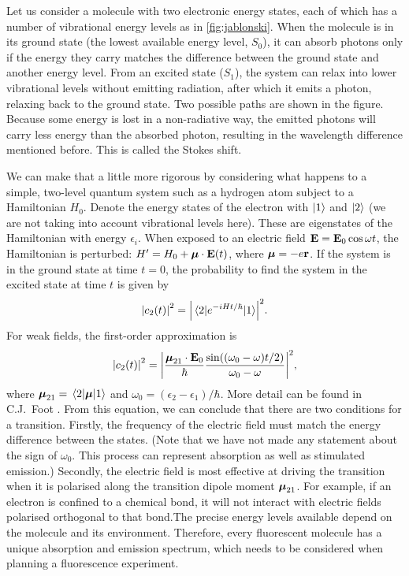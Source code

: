 Let us consider a molecule with two electronic energy states, each of which has a number of vibrational energy levels as in \autoref{fig:jablonski}. When the molecule is in its ground state (the lowest available energy level, $ S_0 $), it can absorb photons only if the energy they carry matches the difference between the ground state and another energy level. From an excited state ($ S_1 $), the system can relax into lower vibrational levels without emitting radiation, after which it emits a photon, relaxing back to the ground state. Two possible paths are shown in the figure. Because some energy is lost in a non-radiative way, the emitted photons will carry less energy than the absorbed photon, resulting in the wavelength difference mentioned before. This is called the Stokes shift. 

We can make that a little more rigorous by considering what happens to a simple, two-level quantum system such as a hydrogen atom subject to a Hamiltonian $ H_0 $. Denote the energy states of the electron with $ \ket{1} $ and $ \ket{2} $ (we are not taking into account vibrational levels here). These are eigenstates of the Hamiltonian with energy $ \epsilon_i $. When exposed to an electric field $ \vb{E} = \vb{E}_0 \cos\omega t$, the Hamiltonian is perturbed: $ H' = H_0 + \vb*{\mu} \cdot \vb{E}(t) $, where $ \vb*{\mu} = -e\vb{r}$. If the system is in the ground state at time $ t=0 $, the probability to find the system in the excited state at time $ t $ is given by
\begin{equation}
	\abs{c_2(t)}^2 = \abs{\mel{2}{e^{-iHt/\hbar}}{1}}^2.
\end{equation}
For weak fields, the first-order approximation is
\begin{equation}
	\abs{c_2(t)}^2 = \abs{ \frac{\vb*{\mu}_{21}\cdot\vb{E}_0}{\hbar}  \frac{\sin((\omega_0-\omega)t/2)}{\omega_0-\omega}}^2,
	\label{eq:transition moment}
\end{equation}
where $ \vb*{\mu}_{21} = \mel{2}{\vb*{\mu}}{1} $ and $ \omega_0 = (\epsilon_2-\epsilon_1)/\hbar $. More detail can be found in C.J.~Foot \cite{Foot}. From this equation, we can conclude that there are two conditions for a transition. Firstly, the frequency of the electric field must match the energy difference between the states. (Note that we have not made any statement about the sign of $ \omega_0 $. This process can represent absorption as well as stimulated emission.) Secondly, the electric field is most effective at driving the transition when it is polarised along the transition dipole moment $ \vb*{\mu}_{21} $. For example, if an electron is confined to a chemical bond, it will not interact with electric fields polarised orthogonal to that bond.The precise energy levels available depend on the molecule and its environment. Therefore, every fluorescent molecule has a unique absorption and emission spectrum, which needs to be considered when planning a fluorescence experiment.

